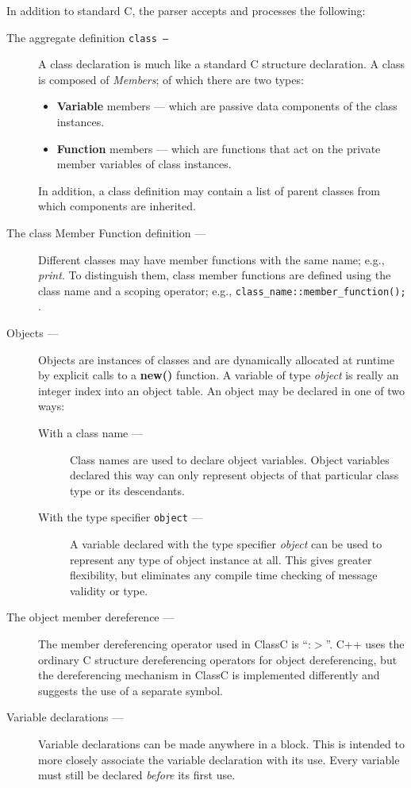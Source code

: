 In addition to standard C, the parser accepts and processes the following:
\begin{description}
\item[ The aggregate definition {\tt class ---}]
A class declaration is much like a standard C structure declaration.
A class is composed of {\em Members};
of which there are two types:
\begin{itemize}
\item {\bf Variable} members ---
which are passive data components of the class instances.
\item {\bf Function} members ---
which are functions that act on the private member variables of class instances.
\end{itemize}
In addition,
a class definition may contain a list of parent classes from which
components are inherited.
\item[The class Member Function definition ---]
Different classes may have member functions with the same name; e.g.,
{\em print}.
To distinguish them, class member functions are defined using the class name
and a scoping operator; e.g., {\tt class\_name::member\_function();} .
\item[Objects ---]
Objects are instances of classes and are dynamically allocated at runtime
by explicit calls to a {\bf new()} function.  A variable of type {\em object}
is really an integer index into an object table.
An object may be declared in one of two ways:

\begin{description}
\item[With a class name ---]
Class names are used to declare object variables.  Object variables declared
this way can only represent objects of that particular
class type or its descendants.
\item[With the type specifier {\tt object} ---]
A variable declared with the type specifier
{\em object}
can be used to represent any type of object instance at all.
This gives greater flexibility, but eliminates any compile time checking of
message validity or type.
\end{description}
\item[The object member dereference ---]
The member dereferencing operator used in ClassC is ``:$>$''.
C++ uses the ordinary C structure dereferencing operators for object
dereferencing, but the dereferencing mechanism in ClassC is implemented
differently and suggests the use of a separate symbol.
\item[ Variable declarations ---]
Variable declarations can be made anywhere in a block.
This is intended to more closely associate the variable declaration
with its use.  Every variable must still
be declared
{\em before} its first use.
\end{description}

